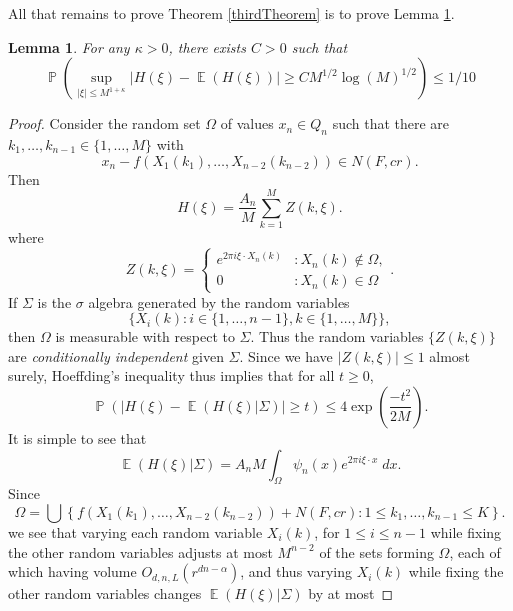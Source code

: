 \documentclass[dvipsnames,letterpaper,12pt]{article}
\numberwithin{equation}{section}
\newtheorem{lemma}[theorem]{Lemma}
\numberwithin{theorem}{section}
\DeclareMathOperator{\EE}{\mathbb{E}}
\DeclareMathOperator{\PP}{\mathbb{P}}
\begin{document}
All that remains to prove Theorem \ref{thirdTheorem} is to prove Lemma \ref{lastconcentrationbound}.

\begin{lemma} \label{lastconcentrationbound}
    For any $\kappa > 0$, there exists $C > 0$ such that
    \[ \PP \left( \sup_{|\xi| \leq M^{1 + \kappa}} | H(\xi) - \EE(H(\xi)) | \geq C M^{1/2} \log(M)^{1/2} \right) \leq 1/10 \]
\end{lemma}
\begin{proof}
    Consider the random set $\Omega$ of values $x_n \in Q_n$ such that there are $k_1,\dots,k_{n-1} \in \{ 1,\dots,M \}$ with
    \begin{equation}
        x_n - f(X_1(k_1), \dots, X_{n-2}(k_{n-2})) \in N(F,cr).
    \end{equation}
    Then
    \begin{equation}
        H(\xi) = \frac{A_n}{M} \sum_{k = 1}^M Z(k,\xi).
    \end{equation}
    where
    \[ Z(k,\xi) = \begin{cases} e^{2 \pi i \xi \cdot X_n(k)} &: X_n(k) \not \in \Omega, \\ 0 &: X_n(k) \in \Omega \end{cases}. \]
    If $\Sigma$ is the $\sigma$ algebra generated by the random variables
    \[ \{ X_i(k) : i \in \{ 1, \dots, n-1 \}, k \in \{ 1, \dots, M \} \}, \]
    then $\Omega$ is measurable with respect to $\Sigma$. Thus the random variables $\{ Z(k,\xi) \}$ are \emph{conditionally independent} given $\Sigma$. Since we have $|Z(k,\xi)| \leq 1$ almost surely, Hoeffding's inequality thus implies that for all $t \geq 0$,
    \begin{equation} \label{equationCOIJCOIJX1232312ssss}
        \PP \left( \left| H(\xi) - \EE(H(\xi)|\Sigma) \right| \geq t \right) \leq 4 \exp \left( \frac{-t^2}{2M} \right).
    \end{equation}
    It is simple to see that
    \begin{equation}
        \EE(H(\xi) | \Sigma) = A_n M \int_\Omega \psi_n(x) e^{2 \pi i \xi \cdot x}\; dx.
    \end{equation}
    Since
    \begin{equation}
        \Omega = \bigcup \left\{ f(X_1(k_1), \dots, X_{n-2}(k_{n-2})) + N(F, cr) : 1 \leq k_1,\dots,k_{n-1} \leq K \right\}.
    \end{equation}
    we see that varying each random variable $X_i(k)$, for $1 \leq i \leq n-1$ while fixing the other random variables adjusts at most $M^{n-2}$ of the sets forming $\Omega$, each of which having volume $O_{d,n,L}(r^{dn - \alpha})$, and thus varying $X_i(k)$ while fixing the other random variables changes $\EE(H(\xi)|\Sigma)$ by at most

\end{proof}
\end{document}
